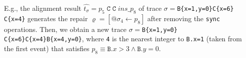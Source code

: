 E.g., the alignment result $\hat{t_\sigma}=p_5\;\texttt{C}\;\texttt{C}\;\textit{ins\_}p_8$ of trace $\sigma=$\texttt{B\{x=1,y=0\}C\{x=6\}\\C\{x=4\}} generates the repair $\varrho=[@\sigma_4\leftarrow p_8]$ after removing the \texttt{sync} operations. Then, we obtain a new trace $\sigma=$\texttt{B\{x=1,y=0\}$  $C\{x=6\}C\{x=4\}B\{x=4,y=0\}}, where \texttt{4} is the nearest integer to \texttt{B.x=1} (taken from the first event) that satisfies $p_8\equiv\texttt{B}.x>3\wedge \texttt{B}.y=0$. 